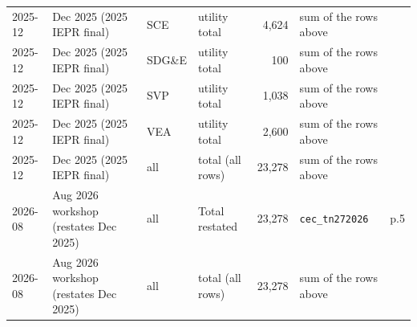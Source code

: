\begin{tabular}{lp{3.2cm}lp{3.4cm}rp{4.2cm}p{5cm}}
2025-12 & Dec 2025 (2025 IEPR final) & SCE & utility total & 4,624 & sum of the rows above & \\
2025-12 & Dec 2025 (2025 IEPR final) & SDG\&E & utility total & 100 & sum of the rows above & \\
2025-12 & Dec 2025 (2025 IEPR final) & SVP & utility total & 1,038 & sum of the rows above & \\
2025-12 & Dec 2025 (2025 IEPR final) & VEA & utility total & 2,600 & sum of the rows above & \\
2025-12 & Dec 2025 (2025 IEPR final) & all & total (all rows) & 23,278 & sum of the rows above &  \\
\midrule
2026-08 & Aug 2026 workshop (restates Dec 2025) & all & Total restated & 23,278 & \texttt{cec\_\allowbreak{}tn272026} & p.5 \\
2026-08 & Aug 2026 workshop (restates Dec 2025) & all & total (all rows) & 23,278 & sum of the rows above &  \\
\bottomrule
\end{tabular}